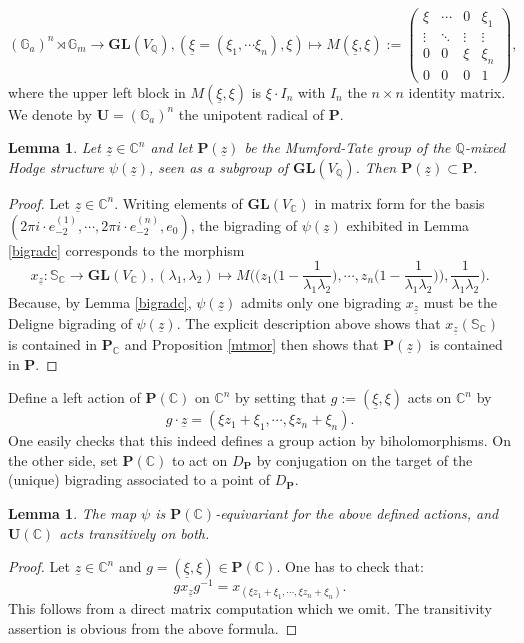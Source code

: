 \documentclass[10pt]{article}
\numberwithin{equation}{subsection}
\theoremstyle{plain}
\newtheorem{lemma}[theorem]{Lemma}
\theoremstyle{definition}
\theoremstyle{remark}
\newcommand{\Q}{\mathbb Q}
\newcommand{\C}{\mathbb C}
\newcommand{\s}{\mathbb S}
\newcommand{\mult}{\mathbb G}
\newcommand{\pp}{\mathbf P}
\newcommand{\uu}{\mathbf U}
\newcommand{\gl}{\mathbf{GL}}
\newcommand{\ee}{e_{-2}}
\newcommand{\zz}{\underline{z}}
\newcommand{\xxi}{\underline{\xi}}
\begin{document}
\[
(\mult_a)^n \rtimes \mult_m \rightarrow \gl(V_\Q), (\xxi = (\xi_1, \cdots \xi_n), \xi) \mapsto M(\xxi,\xi) := \left(\begin{array}{cccc}\xi  &  \cdots & 0 & \xi_1 \\ \vdots & \ddots & \vdots & \vdots \\0 & 0 & \xi & \xi_n \\0 & 0 & 0 & 1\end{array}\right),
\]
where the upper left block in $M(\xxi, \xi)$ is $\xi \cdot I_n$ with $I_n$ the $n \times n$ identity matrix. We denote by $\uu = (\mult_a)^n$ the unipotent radical of $\pp$.
\begin{lemma}
Let $\zz \in \C^n$ and let $\pp(\zz)$ be the Mumford-Tate group of the $\Q$-mixed Hodge structure $\psi(\zz)$, seen as a subgroup of $\gl(V_\Q)$. Then $\pp(\zz) \subset \pp$.
\end{lemma}
\begin{proof}
Let $\zz \in \C^n$. Writing elements of $\gl(V_\C)$ in matrix form for the basis $(2 \pi i \cdot \ee^{(1)}, \cdots, 2 \pi i \cdot \ee^{(n)}, e_0)$, the bigrading of $\psi(\zz)$ exhibited in Lemma \ref{bigradc} corresponds to the morphism
\[
x_{\zz} : \s_\C \rightarrow \gl(V_\C), (\lambda_1, \lambda_2) \mapsto M\Big(\Big(z_1 \Big(1- \frac{1}{\lambda_1\lambda_2}\Big), \cdots, z_n \Big(1- \frac{1}{\lambda_1\lambda_2}\Big)\Big), \frac{1}{\lambda_1\lambda_2}\Big).
\]
Because, by Lemma \ref{bigradc}, $\psi(\zz)$ admits only one bigrading $x_{\zz}$ must be the Deligne bigrading of $\psi(\zz)$. The explicit description above shows that $x_{\zz}(\s_\C)$ is contained in $\pp_\C$ and Proposition \ref{mtmor} then shows that $\pp(\zz)$ is contained in $\pp$.
\end{proof}
Define a left action of $\pp(\C)$ on $\C^n$ by setting that $g := (\xxi, \xi)$ acts on $\C^n$ by
\[
g \cdot \zz = (\xi z_1 + \xi_1, \cdots, \xi z_n + \xi_n).
\]
One easily checks that this indeed defines a group action by biholomorphisms. On the other side, set $\pp(\C)$ to act on $D_\pp$ by conjugation on the target of the (unique) bigrading associated to a point of $D_\pp$.
\begin{lemma}\label{equivc}
The map $\psi$ is $\pp(\C)$-equivariant for the above defined actions, and $\uu(\C)$ acts transitively on both.
\end{lemma}
\begin{proof}
Let  $\zz \in \C^n$ and $g = (\xxi, \xi) \in \pp(\C)$. One has to check that:
\[
g x_{\zz} g^{-1} = x_{(\xi z_1 + \xi_1, \cdots, \xi z_n + \xi_n)}.
\]
This follows from a direct matrix computation which we omit. The transitivity assertion is obvious from the above formula.
\end{proof}
\end{document}
